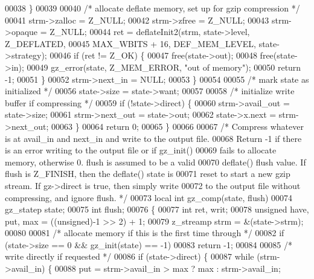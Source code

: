 \begin{DoxyCode}
00038         \}
00039 
00040         \textcolor{comment}{/* allocate deflate memory, set up for gzip compression */}
00041         strm->zalloc = Z\_NULL;
00042         strm->zfree = Z\_NULL;
00043         strm->opaque = Z\_NULL;
00044         ret = deflateInit2(strm, state->level, Z\_DEFLATED,
00045                            MAX\_WBITS + 16, DEF\_MEM\_LEVEL, state->strategy);
00046         \textcolor{keywordflow}{if} (ret != Z\_OK) \{
00047             free(state->out);
00048             free(state->in);
00049             gz\_error(state, Z\_MEM\_ERROR, \textcolor{stringliteral}{"out of memory"});
00050             \textcolor{keywordflow}{return} -1;
00051         \}
00052         strm->next\_in = NULL;
00053     \}
00054 
00055     \textcolor{comment}{/* mark state as initialized */}
00056     state->size = state->want;
00057 
00058     \textcolor{comment}{/* initialize write buffer if compressing */}
00059     \textcolor{keywordflow}{if} (!state->direct) \{
00060         strm->avail\_out = state->size;
00061         strm->next\_out = state->out;
00062         state->x.next = strm->next\_out;
00063     \}
00064     \textcolor{keywordflow}{return} 0;
00065 \}
00066 
00067 \textcolor{comment}{/* Compress whatever is at avail\_in and next\_in and write to the output file.}
00068 \textcolor{comment}{   Return -1 if there is an error writing to the output file or if gz\_init()}
00069 \textcolor{comment}{   fails to allocate memory, otherwise 0.  flush is assumed to be a valid}
00070 \textcolor{comment}{   deflate() flush value.  If flush is Z\_FINISH, then the deflate() state is}
00071 \textcolor{comment}{   reset to start a new gzip stream.  If gz->direct is true, then simply write}
00072 \textcolor{comment}{   to the output file without compressing, and ignore flush. */}
00073 local \textcolor{keywordtype}{int} gz\_comp(state, flush)
00074     gz\_statep state;
00075     \textcolor{keywordtype}{int} flush;
00076 \{
00077     \textcolor{keywordtype}{int} ret, writ;
00078     \textcolor{keywordtype}{unsigned} have, put, max = ((unsigned)-1 >> 2) + 1;
00079     z\_streamp strm = &(state->strm);
00080 
00081     \textcolor{comment}{/* allocate memory if this is the first time through */}
00082     \textcolor{keywordflow}{if} (state->size == 0 && gz\_init(state) == -1)
00083         \textcolor{keywordflow}{return} -1;
00084 
00085     \textcolor{comment}{/* write directly if requested */}
00086     \textcolor{keywordflow}{if} (state->direct) \{
00087         \textcolor{keywordflow}{while} (strm->avail\_in) \{
00088             put = strm->avail\_in > max ? max : strm->avail\_in;

\end{DoxyCode}

